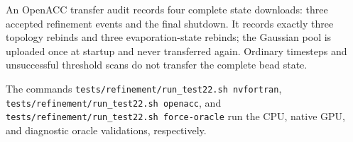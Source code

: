 An OpenACC transfer audit records four complete state downloads: three
accepted refinement events and the final shutdown. It records exactly three
topology rebinds and three evaporation-state rebinds; the Gaussian pool is
uploaded once at startup and never transferred again. Ordinary timesteps and unsuccessful threshold scans do not transfer
the complete bead state.

The commands
\texttt{tests/refinement/run\_test22.sh nvfortran},
\texttt{tests/refinement/run\_test22.sh openacc}, and
\texttt{tests/refinement/run\_test22.sh force-oracle} run the CPU, native GPU,
and diagnostic oracle validations, respectively.
